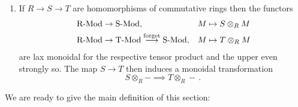 \begin{enumerate}[label=\roman*)]
\begin{gather*}
                    X + Y \longrightarrow 0 + X \overset{\eta^{-1}_L}{\longrightarrow} Y        
                \end{gather*}
                or equivalently
                \begin{gather*}
                    X  \overset{\eta_R}{\longrightarrow} X \times 0 \longrightarrow X \times Y \\
                    X  \overset{\eta_L}{\longrightarrow} 0 \times X \longrightarrow X \times Y \,;
                \end{gather*}
                concisely, by the matrix
                \begin{equation*}
                    \begin{pmatrix} \id_X & 0 \\ 0 & \id_Y \end{pmatrix} \,\colon X + Y \to X \times Y \,,
                \end{equation*}
                where $0$ denotes the unique map of any object factoring through the zero-object. This refinement is not strong for example fo $\nicefrac{*}{\Set}$.\label{chIV-8-ii}
            \item
                If $R \to S \to T$ are homomorphisms of commutative rings then the functors
                \begin{align*}
                    &\operatorname{R-Mod} \to \operatorname{S-Mod}, &&M \mapsto S \otimes_R M \\
                    &\operatorname{R-Mod} \to \operatorname{T-Mod} \overset{\text{forget}}{\longrightarrow} \operatorname{S-Mod}, &&M \mapsto T \otimes_R M
                \end{align*}
                are lax monoidal for the respective tensor product and the upper even strongly so. The map $S \to T$ then induces a monoidal transformation
                \begin{equation*}
                    S \otimes_R - \implies T \otimes_R - \,.
                \end{equation*}
        \end{enumerate}
        We are ready to give the main definition of this section:

